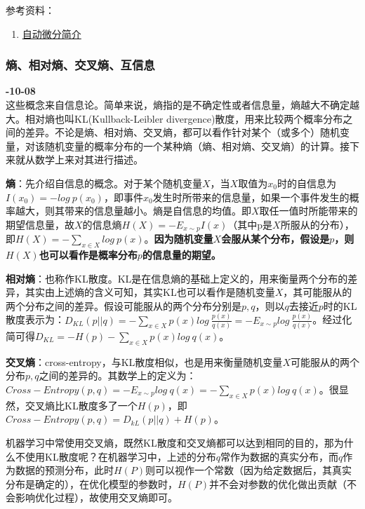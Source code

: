 参考资料：
\begin{enumerate}
    \item \href{https://blog.csdn.net/aws3217150/article/details/70214422}{自动微分简介}
\end{enumerate}


\subsubsection{熵、相对熵、交叉熵、互信息} 
\textbf{-10-08}\\
这些概念来自信息论\cite{6773024}。简单来说，熵指的是不确定性或者信息量，熵越大不确定越大。相对熵也叫KL(Kullback-Leibler divergence)散度，用来比较两个概率分布之间的差异。不论是熵、相对熵、交叉熵，都可以看作针对某个（或多个）随机变量，对该随机变量的概率分布的一个某种熵（熵、相对熵、交叉熵）的计算。接下来就从数学上来对其进行描述。

\textbf{熵}：先介绍自信息的概念。对于某个随机变量$X$，当$X$取值为$x_0$时的自信息为$I(x_0) = -log\ p(x_0)$，即事件$x_0$发生时所带来的信息量，如果一个事件发生的概率越大，则其带来的信息量越小。熵是自信息的均值。即$X$取任一值时所能带来的期望信息量，故$X$的信息熵$H(X) = -E_{x\sim p}I(x)$（其中p是$X$所服从的分布），即$H(X) = -\sum_{x \in X}log\ p(x)$。\textbf{因为随机变量$X$会服从某个分布，假设是$p$，则$H(X)$也可以看作是概率分布$p$的信息量的期望。}

\textbf{相对熵}：也称作KL散度。KL是在信息熵的基础上定义的，用来衡量两个分布的差异，其实由上述熵的含义可知，其实KL也可以看作是随机变量$X$，其可能服从的两个分布之间的差异。假设可能服从的两个分布分别是$p, q$，则以$q$去接近$p$时的KL散度表示为：$D_{KL}(p||q) = -\sum_{x \in X} p(x) log\ \frac{p(x)}{q(x)} = -E_{x\sim p} log\ \frac{p(x)}{q(x)}$。经过化简可得$D_{KL} = -H(p) - \sum_{x \in X}p(x)log\ q(x)$。

\textbf{交叉熵}：cross-entropy，与KL散度相似，也是用来衡量随机变量$X$可能服从的两个分布$p, q$之间的差异的。其数学上的定义为：$Cross-Entropy(p, q) = -E_{x\sim p} log\ q(x) = - \sum_{x \in X}p(x)log\ q(x)$。很显然，交叉熵比KL散度多了一个$H(p)$，即$Cross-Entropy(p, q) = D_{kL}(p || q) + H(p)$。

机器学习中常使用交叉熵，既然KL散度和交叉熵都可以达到相同的目的，那为什么不使用KL散度呢？在机器学习中，上述的分布$q$常作为数据的真实分布，而$q$作为数据的预测分布，此时$H(P)$则可以视作一个常数（因为给定数据后，其真实分布是确定的），在优化模型的参数时，$H(P)$并不会对参数的优化做出贡献（不会影响优化过程），故使用交叉熵即可。

